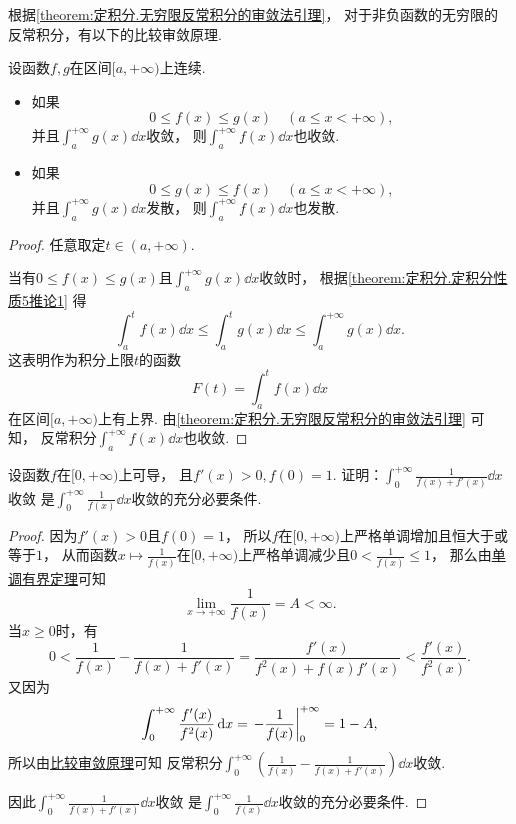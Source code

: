 根据\cref{theorem:定积分.无穷限反常积分的审敛法引理}，
对于非负函数的无穷限的反常积分，有以下的比较审敛原理.
\begin{theorem}[比较审敛原理]\label{theorem:定积分.无穷限反常积分的比较审敛原理}
设函数\(f,g\)在区间\([a,+\infty)\)上连续.
\begin{itemize}
	\item 如果\[
		0 \leq f(x) \leq g(x)
		\quad(a \leq x < +\infty),
	\]
	并且\(\int_a^{+\infty} g(x) \dd{x}\)收敛，
	则\(\int_a^{+\infty} f(x) \dd{x}\)也收敛.

	\item 如果\[
		0 \leq g(x) \leq f(x)
		\quad(a \leq x < +\infty),
	\]
	并且\(\int_a^{+\infty} g(x) \dd{x}\)发散，
	则\(\int_a^{+\infty} f(x) \dd{x}\)也发散.
\end{itemize}
\begin{proof}
任意取定\(t \in (a,+\infty)\).

当有\(0 \leq f(x) \leq g(x)\)且\(\int_a^{+\infty} g(x) \dd{x}\)收敛时，
根据\cref{theorem:定积分.定积分性质5推论1}
得\[
	\int_a^t f(x) \dd{x}
	\leq
	\int_a^t g(x) \dd{x}
	\leq
	\int_a^{+\infty} g(x) \dd{x}.
\]
这表明作为积分上限\(t\)的函数\[
	F(t) = \int_a^t f(x) \dd{x}
\]
在区间\([a,+\infty)\)上有上界.
由\cref{theorem:定积分.无穷限反常积分的审敛法引理} 可知，
反常积分\(\int_a^{+\infty} f(x) \dd{x}\)也收敛.
\end{proof}
\end{theorem}

\begin{example}
设函数\(f\)在\([0,+\infty)\)上可导，
且\(f'(x)>0,f(0)=1\).
证明：\(\int_0^{+\infty} \frac1{f(x)+f'(x)} \dd{x}\)收敛
是\(\int_0^{+\infty} \frac1{f(x)} \dd{x}\)收敛的充分必要条件.
\begin{proof}
因为\(f'(x)>0\)且\(f(0)=1\)，
所以\(f\)在\([0,+\infty)\)上严格单调增加且恒大于或等于\(1\)，
从而函数\(x \mapsto \frac1{f(x)}\)在\([0,+\infty)\)上严格单调减少且\(0 < \frac1{f(x)} \leq 1\)，
那么由\hyperref[theorem:极限.函数的单调有界定理]{单调有界定理}可知\[
	\lim_{x\to+\infty} \frac1{f(x)} = A < \infty.
\]
当\(x\geq0\)时，有\[
	0 < \frac1{f(x)} - \frac1{f(x)+f'(x)}
	= \frac{f'(x)}{f^2(x)+f(x) f'(x)}
	< \frac{f'(x)}{f^2(x)}.
\]
又因为\[
	\int_0^{+\infty} \frac{f'(x)}{f^2(x)} \dd{x}
	= \eval{-\frac1{f(x)}}_0^{+\infty}
	= 1 - A,
\]
所以由\hyperref[theorem:定积分.无穷限反常积分的比较审敛原理]{比较审敛原理}可知
反常积分\(\int_0^{+\infty} \left( \frac1{f(x)} - \frac1{f(x)+f'(x)} \right) \dd{x}\)收敛.

因此\(\int_0^{+\infty} \frac1{f(x)+f'(x)} \dd{x}\)收敛
是\(\int_0^{+\infty} \frac1{f(x)} \dd{x}\)收敛的充分必要条件.
\end{proof}
\end{example}

